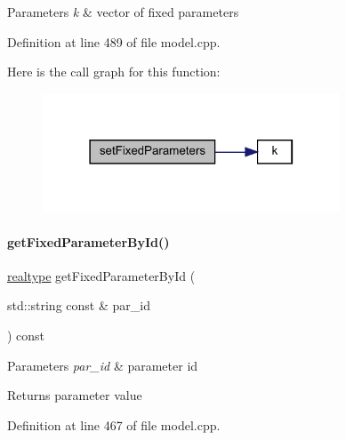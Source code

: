\begin{DoxyParams}{Parameters}
{\em k} & vector of fixed parameters \\
\hline
\end{DoxyParams}


Definition at line 489 of file model.\+cpp.

Here is the call graph for this function\+:
\nopagebreak
\begin{figure}[H]
\begin{center}
\leavevmode
\includegraphics[width=250pt]{classamici_1_1_model_a14ba63ae81b4e8fa1f46884b703e2c30_cgraph}
\end{center}
\end{figure}
\mbox{\label{classamici_1_1_model_acc647ebbeaf0be737c7c165fa77eeca5}} 
\paragraph{\texorpdfstring{get\+Fixed\+Parameter\+By\+Id()}{getFixedParameterById()}}
{\footnotesize\ttfamily \mbox{\hyperlink{namespaceamici_a1bdce28051d6a53868f7ccbf5f2c14a3}{realtype}} get\+Fixed\+Parameter\+By\+Id (\begin{DoxyParamCaption}\item[{std\+::string const \&}]{par\+\_\+id }\end{DoxyParamCaption}) const}


\begin{DoxyParams}{Parameters}
{\em par\+\_\+id} & parameter id \\
\hline
\end{DoxyParams}
\begin{DoxyReturn}{Returns}
parameter value 
\end{DoxyReturn}


Definition at line 467 of file model.\+cpp.

